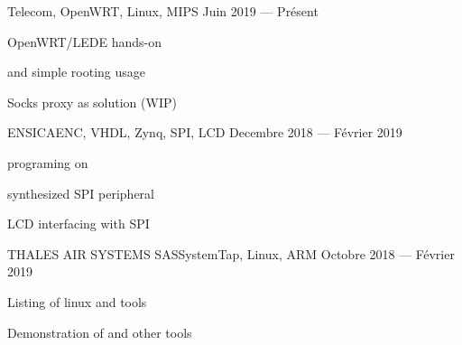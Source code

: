 
    {}{Telecom, OpenWRT, Linux, MIPS}
    {Juin 2019 --- Présent}
    {%
        \begin{additems}
            \item OpenWRT/LEDE  hands-on
            \item {} and simple rooting usage
            \item Socks proxy as  solution (WIP)
        \end{additems}
    }


    {ENSICAEN}{C, VHDL, Zynq, SPI, LCD}
    {Decembre 2018 --- Février 2019}
    {%
        \begin{additems}
            \item {} programing on 
            \item {} synthesized SPI peripheral
            \item LCD interfacing with SPI
        \end{additems}
    }

    {THALES AIR SYSTEMS SAS}{SystemTap, Linux, ARM}
    {Octobre 2018 --- Février 2019}
    {%
        \begin{additems}
            \item Listing of linux  and  tools
            \item Demonstration of  and other tools
        \end{additems}
    }

